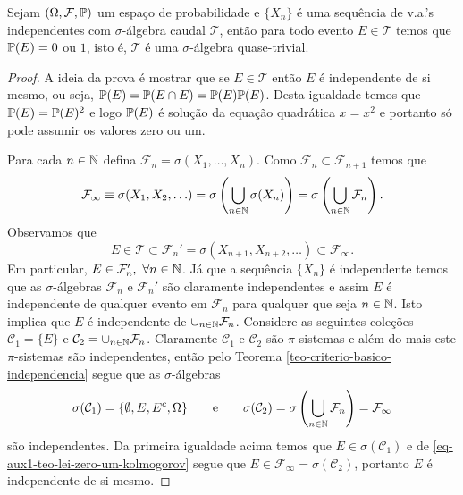\begin{teorema}
\label{teo-lei-zero-um-kolmogorov}
Sejam $(\Omega,\F,\P)$ um espaço de probabilidade
e $\{X_n\}$ é uma sequência de v.a.'s independentes
com $\sigma$-álgebra caudal $\mathcal{T}$, então 
para todo evento $E\in\mathcal{T}$ temos que 
$\P(E)=0$ ou $1$, isto é, $\mathcal{T}$ 
é uma $\sigma$-álgebra quase-trivial.
\end{teorema}


\begin{proof}
A ideia da prova é mostrar que se $E\in\mathcal{T}$
então $E$ é independente de si mesmo, ou seja,
$\P(E)=\P(E\cap E)=\P(E)\P(E)$. Desta igualdade 
temos que $\P(E)=\P(E)^2$ e logo $\P(E)$ é solução 
da equação quadrática $x=x^2$ e portanto só pode 
assumir os valores zero ou um.   


Para cada $n\in\N$ defina $\mathcal{F}_n=\sigma(X_1,\ldots,X_n)$.
Como $\mathcal{F}_n\subset \mathcal{F}_{n+1}$ temos que  
\[
	\mathcal{F}_{\infty}
	\equiv
	\sigma(X_1,X_2,\ldots)
	=
	\sigma\left( \bigcup_{n\in\N} \sigma(X_n) \right)
	=
	\sigma\left( \bigcup_{n\in\N} \mathcal{F}_n \right).
\]
Observamos que
\begin{equation}\label{eq-aux1-teo-lei-zero-um-kolmogorov}
	E\in \mathcal{T}\subset \mathcal{F}_n'
	=
	\sigma(X_{n+1},X_{n+2},\ldots)
	\subset 
	\mathcal{F}_{\infty}.
\end{equation}
Em particular, $E\in \mathcal{F}_n',\ \forall n\in\N$.
Já que a sequência $\{X_n\}$ é independente temos que
as $\sigma$-álgebras $\mathcal{F}_n$ e $\mathcal{F}_n'$
são claramente independentes e assim $E$ é independente
de qualquer evento em $\mathcal{F}_n$ para qualquer 
que seja $n\in\N$. Isto implica que $E$ é independente
de $\cup_{n\in\N} \mathcal{F}_n$.
Considere as seguintes coleções $\mathcal{C}_1=\{E\}$ 
e $\mathcal{C}_2=\cup_{n\in\N} \mathcal{F}_n$. Claramente
$\mathcal{C}_1$ e $\mathcal{C}_2$ são $\pi$-sistemas e 
além do mais este $\pi$-sistemas são independentes,
então pelo Teorema \ref{teo-criterio-basico-independencia}
segue que as $\sigma$-álgebras
	\[
	\sigma(\mathcal{C}_1)=\{\emptyset,E,E^c,\Omega\}
	\qquad
	\text{e}
	\qquad
	\sigma(\mathcal{C}_2)
		=\sigma\left( \bigcup_{n\in\N} \mathcal{F}_n \right)
		=\mathcal{F}_{\infty}
	\]
são independentes. Da primeira 
igualdade acima temos que 
$E\in \sigma(\mathcal{C}_1)$ e de 
\eqref{eq-aux1-teo-lei-zero-um-kolmogorov} 
segue que 
$E\in \mathcal{F}_{\infty}=\sigma(\mathcal{C}_2)$, 
portanto $E$ é independente de si mesmo.
\end{proof}













